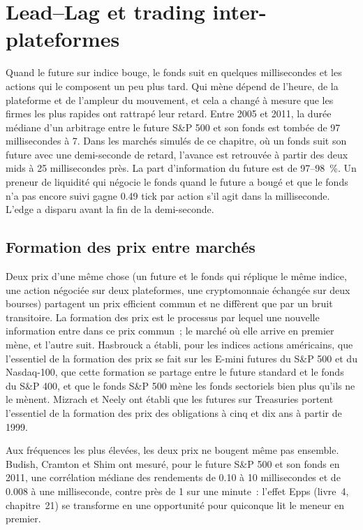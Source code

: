 \chapter{Lead--Lag et trading inter-plateformes}\label{ch:hf:lead-lag-and-cross-venue-trading}

Quand le future sur indice bouge, le fonds suit en quelques millisecondes et les actions qui le composent un peu plus tard. Qui mène dépend de l'heure, de la
plateforme et de l'ampleur du mouvement, et cela a changé à mesure que les firmes les plus rapides ont rattrapé leur retard. Entre 2005 et 2011, la durée médiane d'un arbitrage entre
le future S\&P 500 et son fonds est tombée de 97 millisecondes à 7. Dans les marchés simulés de ce chapitre, où un fonds suit son future avec une demi-seconde
de retard, l'avance est retrouvée à partir des deux mids à 25 millisecondes près. La part d'information du future est de 97--98~\%. Un preneur de liquidité qui négocie le fonds quand
le future a bougé et que le fonds n'a pas encore suivi gagne 0.49 tick par action s'il agit dans la milliseconde. L'edge a disparu avant la fin de la demi-seconde.

\section{Formation des prix entre marchés}

Deux prix d'une même chose (un future et le fonds qui réplique le même indice, une action négociée sur deux plateformes, une cryptomonnaie échangée sur deux bourses) partagent un
prix efficient commun et ne diffèrent que par un bruit transitoire. La formation des prix est le processus par lequel une nouvelle information entre dans ce prix commun~; le marché où elle
arrive en premier mène, et l'autre suit. Hasbrouck a établi, pour les indices actions américains, que l'essentiel de la formation des prix se fait sur les E-mini futures du S\&P
500 et du Nasdaq-100, que cette formation se partage entre le future standard et le fonds du S\&P 400, et que le fonds S\&P 500 mène les fonds sectoriels
bien plus qu'ils ne le mènent. Mizrach et Neely ont établi que les futures sur Treasuries portent l'essentiel de la formation des prix des obligations à cinq et dix ans à partir de 1999.

Aux fréquences les plus élevées, les deux prix ne bougent même pas ensemble. Budish, Cramton et Shim ont mesuré, pour le future S\&P 500 et son fonds en 2011,
une corrélation médiane des rendements de 0.10 à 10 millisecondes et de 0.008 à une milliseconde, contre près de 1 sur une minute~: l'effet Epps
(livre~4, chapitre~21) se transforme en une opportunité pour quiconque lit le meneur en premier.

